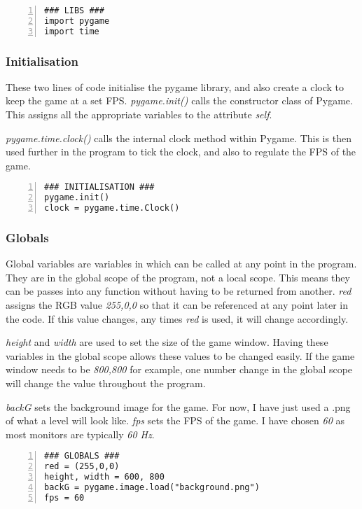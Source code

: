 \documentclass[12pt]{report}
\begin{document}
\begin{Verbatim}[numbers=left, frame=single]
### LIBS ###
import pygame                                                       
import time  
\end{Verbatim}

\subsubsection{Initialisation}
These two lines of code initialise the pygame library, and also create a clock to keep the game at a set FPS. \textit{pygame.init()} calls the constructor class of Pygame. This assigns all the appropriate variables to the attribute \textit{self}.

\textit{pygame.time.clock()} calls the internal clock method within Pygame. This is then used further in the program to tick the clock, and also to regulate the FPS of the game.

\begin{Verbatim}[numbers=left, frame=single]
### INITIALISATION ###
pygame.init()                                                       
clock = pygame.time.Clock()
\end{Verbatim}

\subsubsection{Globals}
Global variables are variables in which can be called at any point in the program. They are in the global scope of the program, not a local scope. This means they can be passes into any function without having to be returned from another. \textit{red} assigns the RGB value \textit{255,0,0} so that it can be referenced at any point later in the code. If this value changes, any times \textit{red} is used, it will change accordingly. 

\textit{height} and \textit{width} are used to set the size of the game window. Having these variables in the global scope allows these values to be changed easily. If the game window needs to be \textit{800,800} for example, one number change in the global scope will change the value throughout the program.

\textit{backG} sets the background image for the game. For now, I have just used a .png of what a level will look like.  \textit{fps} sets the FPS of the game. I have chosen \textit{60} as most monitors are typically \textit{60 Hz}.

\begin{Verbatim}[numbers=left, frame=single]
### GLOBALS ###
red = (255,0,0)
height, width = 600, 800                                
backG = pygame.image.load("background.png")                         
fps = 60 
\end{Verbatim}
\end{document}
